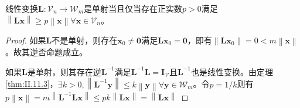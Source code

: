 \documentclass[main.tex]{subfiles}
\begin{document}
\begin{lemma}\label{thm:inv_func_l1}
线性变换$\mathbf{L}:\mathcal{V}_n\rightarrow\mathcal{W}_m$是单射当且仅当存在正实数$p>0$满足$\left\|\mathbf{Lx}\right\|\geq p \left\|\mathbf{x}\right\|\forall\mathbf{x}\in\mathcal{V}_n$。
\end{lemma}
\begin{proof}
如果$\mathbf{L}$不是单射，则存在$\mathbf{x}_0\neq\mathbf{0}$满足$\mathbf{Lx}_0=\mathbf{0}$，即有$\left\|\mathbf{Lx}_0\right\|=0<m\left\|\mathbf{x}\right\|$。故其逆否命题成立。

如果$\mathbf{L}$是单射，则其存在逆$\mathbf{L}^{-1}$满足$\mathbf{L}^{-1}\mathbf{L}=\mathbf{I}_\mathcal{V}$且$\mathbf{L}^{-1}$也是线性变换。由定理\ref{thm:II.11.3}，$\exists k>0, \left\|\mathbf{L}^{-1}\mathbf{y}\right\|\leq k\left\|\mathbf{y}\right\|\forall\mathbf{y}\in\mathcal{W}_m$。令$p=1/k$则有$p\left\|\mathbf{x}\right\|=m\left\|\mathbf{L}^{-1}\mathbf{Lx}\right\|\leq pk\left\|\mathbf{Lx}\right\|=\left\|\mathbf{Lx}\right\|$
\end{proof}
\end{document}

